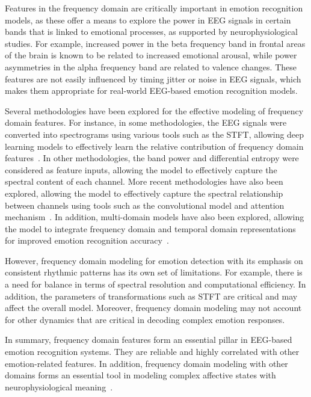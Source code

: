 \documentclass{WileyMSP-template}
\begin{document}
Features in the frequency domain are critically important in emotion recognition models, as these offer a means to explore the power in EEG signals in certain bands that is linked to emotional processes, as supported by neurophysiological studies. For example, increased power in the beta frequency band in frontal areas of the brain is known to be related to increased emotional arousal, while power asymmetries in the alpha frequency band are related to valence changes. These features are not easily influenced by timing jitter or noise in EEG signals, which makes them appropriate for real-world EEG-based emotion recognition models.

Several methodologies have been explored for the effective modeling of frequency domain features. For instance, in some methodologies, the EEG signals were converted into spectrograms using various tools such as the STFT, allowing deep learning models to effectively learn the relative contribution of frequency domain features~\cite{zheng2022multi}. In other methodologies, the band power and differential entropy were considered as feature inputs, allowing the model to effectively capture the spectral content of each channel. More recent methodologies have also been explored, allowing the model to effectively capture the spectral relationship between channels using tools such as the convolutional model and attention mechanism~\cite{song2022eegconformer}. In addition, multi-domain models have also been explored, allowing the model to integrate frequency domain and temporal domain representations for improved emotion recognition accuracy~\cite{li2021multidomain}.

However, frequency domain modeling for emotion detection with its emphasis on consistent rhythmic patterns has its own set of limitations. For example, there is a need for balance in terms of spectral resolution and computational efficiency. In addition, the parameters of transformations such as STFT are critical and may affect the overall model. Moreover, frequency domain modeling may not account for other dynamics that are critical in decoding complex emotion responses.

In summary, frequency domain features form an essential pillar in EEG-based emotion recognition systems. They are reliable and highly correlated with other emotion-related features. In addition, frequency domain modeling with other domains forms an essential tool in modeling complex affective states with neurophysiological meaning~\cite{li2021multidomain, song2022eegconformer, zheng2022multi}.
\end{document}
